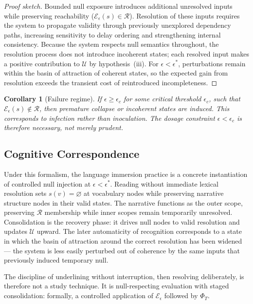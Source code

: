 \documentclass[11pt]{article}
\newtheorem{corollary}{Corollary}
\theoremstyle{remark}
\begin{document}
\begin{proof}[Proof sketch]
Bounded null exposure introduces additional unresolved inputs while preserving reachability ($\mathcal{E}_\epsilon(s) \in \mathcal{R}$). Resolution of these inputs requires the system to propagate validity through previously unexplored dependency paths, increasing sensitivity to delay ordering and strengthening internal consistency. Because the system respects null semantics throughout, the resolution process does not introduce incoherent states; each resolved input makes a positive contribution to $\mathcal{U}$ by hypothesis~(iii). For $\epsilon < \epsilon^*$, perturbations remain within the basin of attraction of coherent states, so the expected gain from resolution exceeds the transient cost of reintroduced incompleteness.
\end{proof}

\begin{corollary}[Failure regime]
If $\epsilon \geq \epsilon_c$ for some critical threshold $\epsilon_c$, such that $\mathcal{E}_\epsilon(s) \notin \mathcal{R}$, then premature collapse or incoherent states are induced. This corresponds to infection rather than inoculation. The dosage constraint $\epsilon < \epsilon_c$ is therefore necessary, not merely prudent.
\end{corollary}

\subsection{Cognitive Correspondence}

Under this formalism, the language immersion practice is a concrete instantiation of controlled null injection at $\epsilon < \epsilon^*$. Reading without immediate lexical resolution sets $s(v) = \varnothing$ at vocabulary nodes while preserving narrative structure nodes in their valid states. The narrative functions as the outer scope, preserving $\mathcal{R}$ membership while inner scopes remain temporarily unresolved. Consolidation is the recovery phase: it drives null nodes to valid resolution and updates $\mathcal{U}$ upward. The later automaticity of recognition corresponds to a state in which the basin of attraction around the correct resolution has been widened --- the system is less easily perturbed out of coherence by the same inputs that previously induced temporary null.

The discipline of underlining without interruption, then resolving deliberately, is therefore not a study technique. It is null-respecting evaluation with staged consolidation: formally, a controlled application of $\mathcal{E}_\epsilon$ followed by $\Phi_T$.
\end{document}

